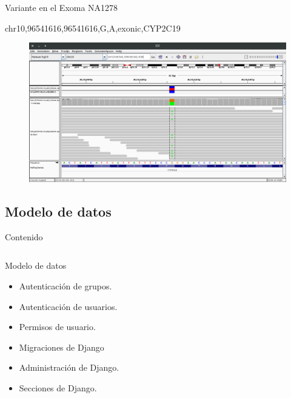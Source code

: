 \documentclass[xcolor=dvipsnames]{beamer}
\begin{document}
\begin{frame}{Variante en el Exoma NA1278}
	
	chr10,96541616,96541616,G,A,exonic,CYP2C19
	
\begin{figure}[H]
	\centering
	\includegraphics[width=1\textwidth]{IGV}
\end{figure}
\end{frame}

\subsection{Modelo de datos}

\begin{frame}{Contenido}
    \begin{columns}[onlytextwidth,T]
        \begin{column}{.55\textwidth}
            \tableofcontents[currentsection, sections=1-3]
        \end{column}
        \begin{column}{.60\textwidth}
            \tableofcontents[currentsection, sections=4-]
        \end{column}
    \end{columns}
\end{frame}

\begin{frame}{Modelo de datos}
    
    \begin{itemize}
    	\item Autenticación de grupos.
    	\item Autenticación de usuarios.
    	\item Permisos de usuario.
    	\item Migraciones de Django 
    	\item Administración de Django.
    	\item Secciones de Django.	 	
    \end{itemize}
    
\end{frame}
\end{document}
